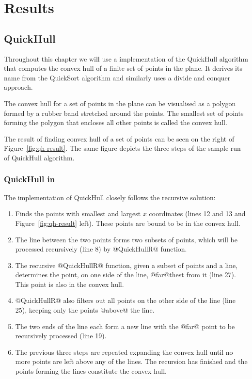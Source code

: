 \documentclass[preamble.tex]{subfiles}
\begin{document}
\clearpage

\chapter{Results}
\label{ch:results}


\section{QuickHull}
\label{sec:QuickHull}

Throughout this chapter we will use a  implementation of the QuickHull algorithm that computes the convex hull of a finite set of points in the plane. It derives its name from the QuickSort algorithm and similarly uses a divide and conquer approach.

The convex hull for a set of points in the plane can be visualised as a polygon formed by a rubber band stretched around the points. The smallest set of points forming the polygon that encloses all other points is called the convex hull.

The result of finding convex hull of a set of points can be seen on the right of Figure~\ref{fig:qh-result}. The same figure depicts the three steps of the sample run of QuickHull algorithm.


\subsection{QuickHull in \DPH}

The \DPH implementation of QuickHull closely follows the recursive solution:
\begin{enumerate}
  \item Finds the points with smallest and largest $x$ coordinates (lines 12 and 13 and Figure~\ref{fig:qh-result} left). These points are bound to be in the convex hull.

  \item The line between the two points forms two subsets of points, which will be processed recursively (line 8) by @QuickHullR@ function.

  \item The recursive @QuickHullR@ function, given a subset of points and a line, determines the point, on one side of the line, @far@thest from it (line 27). This point is also in the convex hull.

  \item @QuickHullR@ also filters out all points on the other side of the line (line 25), keeping only the points @above@ the line.

  \item The two ends of the line each form a new line with the @far@ point to be recursively processed (line 19).

  \item The previous three steps are repeated expanding the convex hull until no more points are left above any of the lines. The recursion has finished and the points forming the lines constitute the convex hull.
\end{enumerate}
\end{document}
